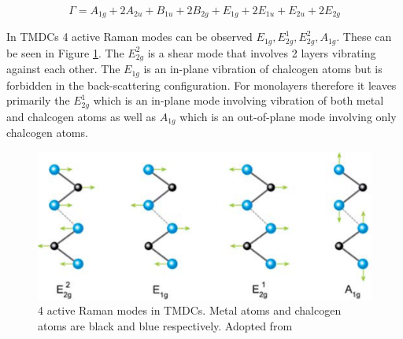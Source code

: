 \documentclass[12pt]{article}
\begin{document}
	\begin{equation}
	{\Gamma} = A_{1g} + 2A_{2u} + B_{1u} + 2B_{2g} + E_{1g} + 2E_{1u} + E_{2u} + 2E_{2g}
	\label{eq:PhononDispersionRepresentation} 
	\end{equation}
	
	In TMDCs 4 active Raman modes can be observed $E_{1g}, E^1_{2g}, E^2_{2g}, A_{1g}$. These can be seen in Figure \ref{fig:4ActiveRamanModes}. The $E^2_{2g}$ is a shear mode that involves 2 layers vibrating against each other. The $E_{1g}$ is an in-plane vibration of chalcogen atoms but is forbidden in the back-scattering configuration. For monolayers therefore it leaves primarily the $E^1_{2g}$ which is an in-plane mode involving vibration of both metal and chalcogen atoms as well as $A_{1g}$ which is an out-of-plane mode involving only chalcogen atoms. 
	
	\begin{figure}[h]
	\begin{center}
	\includegraphics[scale=0.4]{RamanActiveModes.png}
	\caption{4 active Raman modes in TMDCs. Metal atoms and chalcogen atoms are black and blue respectively. Adopted from \cite{LatticeDynamicsInMono-AndFew-LayerSheetsOfWS2AndWSe2}}
	\label{fig:4ActiveRamanModes}
	\end{center}
	\end{figure}
	
\end{document}
